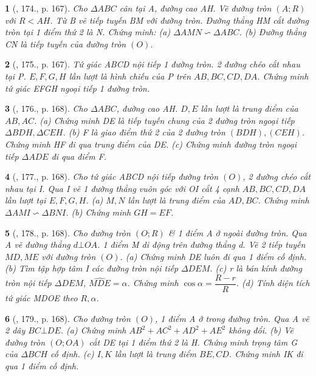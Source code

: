 \documentclass{article}
\newtheorem{baitoan}{}
\begin{document}
\begin{baitoan}[\cite{Tuyen_Toan_9_old}, 174., p. 167]
	Cho $\Delta ABC$ cân tại A, đường cao AH. Vẽ đường tròn $(A;R)$ với $R < AH$. Từ B vẽ tiếp tuyến BM với đường tròn. Đường thẳng HM cắt đường tròn tại 1 điểm thứ 2 là N. Chứng minh: (a) $\Delta AMN\backsim\Delta ABC$. (b) Đường thẳng CN là tiếp tuyến của đường tròn $(O)$.
\end{baitoan}

\begin{baitoan}[\cite{Tuyen_Toan_9_old}, 175., p. 167]
	Tứ giác ABCD nội tiếp 1 đường tròn. 2 đường chéo cắt nhau tại P. $E,F,G,H$ lần lượt là hình chiếu của P trên $AB,BC,CD,DA$. Chứng minh tứ giác EFGH ngoại tiếp 1 đường tròn.
\end{baitoan}

\begin{baitoan}[\cite{Tuyen_Toan_9_old}, 176., p. 168]
	Cho $\Delta ABC$, đường cao AH. $D,E$ lần lượt là trung điểm của $AB,AC$. (a) Chứng minh DE là tiếp tuyến chung của 2 đường tròn ngoại tiếp $\Delta BDH,\Delta CEH$. (b) F là giao điểm thứ 2 của 2 đường tròn $(BDH),(CEH)$. Chứng minh HF đi qua trung điểm của DE. (c) Chứng minh đường tròn ngoại tiếp $\Delta ADE$ đi qua điểm F.
\end{baitoan}

\begin{baitoan}[\cite{Tuyen_Toan_9_old}, 177., p. 168]
	Cho tứ giác ABCD nội tiếp đường tròn $(O)$, 2 đường chéo cắt nhau tại I. Qua I vẽ 1 đường thẳng vuôn góc với OI cắt 4 cạnh $AB,BC,CD,DA$ lần lượt tại $E,F,G,H$. (a) $M,N$ lần lượt là trung điểm của $AD,BC$. Chứng minh $\Delta AMI\backsim\Delta BNI$. (b) Chứng minh $GH = EF$.
\end{baitoan}

\begin{baitoan}[\cite{Tuyen_Toan_9_old}, 178., p. 168]
	Cho đường tròn $(O;R)$ \& 1 điểm A ở ngoài đường tròn. Qua A vẽ đường thẳng $d\bot OA$. 1 điểm M di động trên đường thẳng d. Vẽ 2 tiếp tuyến $MD,ME$ với đường tròn $(O)$. (a) Chứng minh DE luôn đi qua 1 điểm cố định. (b) Tìm tập hợp tâm I các đường tròn nội tiếp $\Delta DEM$. (c) r là bán kính đường tròn nội tiếp $\Delta DEM$, $\widehat{MDE} = \alpha$. Chứng minh $\cos\alpha = \dfrac{R - r}{R}$. (d) Tính diện tích tứ giác MDOE theo $R,\alpha$.
\end{baitoan}

\begin{baitoan}[\cite{Tuyen_Toan_9_old}, 179., p. 168]
	Cho đường tròn $(O)$, 1 điểm A ở trong đường tròn. Qua A vẽ 2 dây $BC\bot DE$. (a) Chứng minh $AB^2 + AC^2 + AD^2 + AE^2$ không đổi. (b) Vẽ đường tròn $(O;OA)$ cắt DE tại 1 điểm thứ 2 là H. Chứng minh trọng tâm G của $\Delta BCH$ cố định. (c) $I,K$ lần lượt là trung điểm $BE,CD$. Chứng minh IK đi qua 1 điểm cố định.
\end{baitoan}
\end{document}
